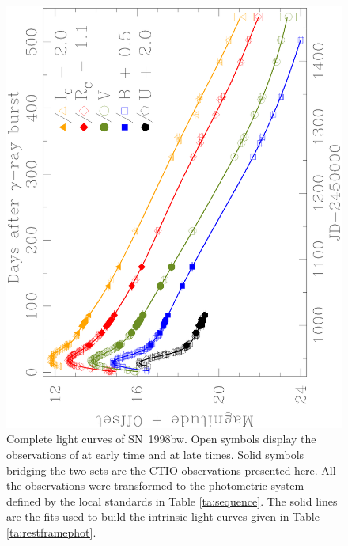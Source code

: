 \documentclass[12pt,preprint]{aastex}
\begin{document}
\begin{figure}[t]
\includegraphics[angle=-90,scale=.70]{fig2.eps}
\caption{Complete light curves of SN~1998bw. Open symbols display the observations of \citet{getal98} at early time and \citet{soetal02} at
late times. Solid symbols bridging the two sets
are the CTIO observations presented here. All the observations were transformed to the photometric system
defined by the local standards in Table \ref{ta:sequence}. The solid lines are the fits used to build the intrinsic light curves given in Table \ref{ta:restframephot}.
\label{fi:phot}}
\end{figure}

\clearpage
\end{document}
